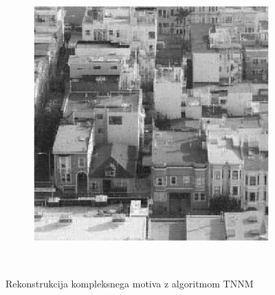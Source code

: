 \begin{figure}
\begin{subfigure}{0.325\linewidth}
    \end{subfigure}
    \hfill
    \begin{subfigure}{0.325\linewidth}
        \includegraphics[width=\linewidth]{Poglavja/Slike/kompleksna grayscale 300/rez60TNNM.png}
    \end{subfigure}\\[-1cm]
    \caption{Rekonstrukcija kompleksnega motiva z algoritmom TNNM}
\end{figure}
